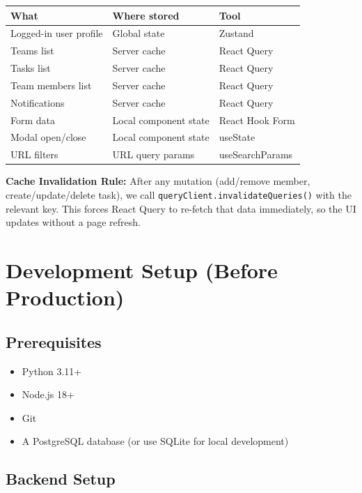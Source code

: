 \documentclass[12pt,a4paper]{article}
\begin{document}
\begin{center}
\begin{tabular}{lll}
\toprule
\textbf{What} & \textbf{Where stored} & \textbf{Tool} \\
\midrule
Logged-in user profile & Global state & Zustand \\
Teams list & Server cache & React Query \\
Tasks list & Server cache & React Query \\
Team members list & Server cache & React Query \\
Notifications & Server cache & React Query \\
Form data & Local component state & React Hook Form \\
Modal open/close & Local component state & useState \\
URL filters & URL query params & useSearchParams \\
\bottomrule
\end{tabular}
\end{center}

\begin{warnbox}
\textbf{Cache Invalidation Rule:} After any mutation (add/remove member, create/update/delete task), we call \texttt{queryClient.invalidateQueries()} with the relevant key. This forces React Query to re-fetch that data immediately, so the UI updates without a page refresh.
\end{warnbox}


\section{Development Setup (Before Production)}

\subsection{Prerequisites}
\begin{itemize}
    \item Python 3.11+
    \item Node.js 18+
    \item Git
    \item A PostgreSQL database (or use SQLite for local development)
\end{itemize}

\subsection{Backend Setup}
\end{document}
